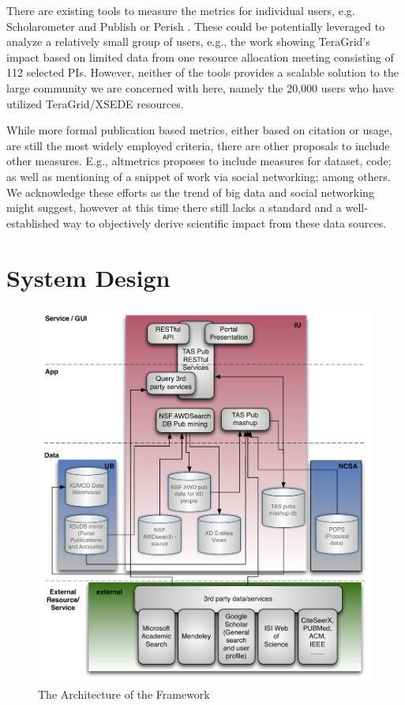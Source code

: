 \documentclass{sig-alternate}
\begin{document}
There are existing tools to measure the metrics for individual users, e.g. Scholarometer \cite{kaur2012scholarometer} and Publish or Perish \cite{www-pop}. These could be potentially leveraged to analyze a relatively small group of users, e.g., the work \cite{bollen2011and} showing TeraGrid's impact based on limited data from one resource allocation meeting consisting of 112 selected PIs. 
However, neither of the tools provides a scalable solution to the large community we are concerned with here, namely the 20,000 users who have utilized TeraGrid/XSEDE resources.  
 
While more formal publication based metrics, either based on citation or usage, are still the most widely employed criteria, there are other proposals to include other measures. E.g., altmetrics \cite{www-altmetrics} proposes to include measures for dataset, code; as well as mentioning of a snippet of work via social networking; among others. We acknowledge these efforts as the trend of big data and social networking might suggest, however at this time there still lacks a standard and a well-established way to objectively derive scientific impact from these data sources. 


\section{System Design} \label{S:design}
 
\begin{figure}[!htb] 
  \centering 
    \includegraphics[width=1.0\columnwidth]{images/tas-arch.pdf} 
  \caption{The Architecture of the Framework}\label{F:tas-arch} 
\end{figure} 
\end{document}
